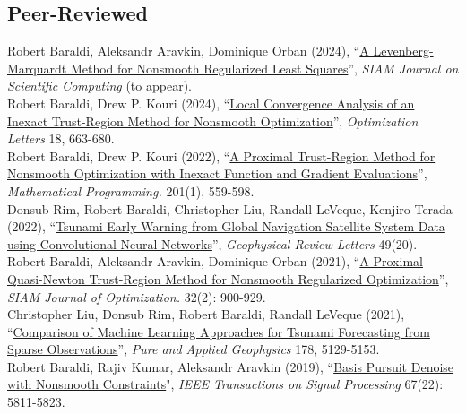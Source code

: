 \documentclass[10pt, a4paper]{article}
\newcommand{\years}[1]{\marginnote{\scriptsize #1}}
\begin{document}
\subsection*{Peer-Reviewed}
\years{2024} Robert Baraldi, Aleksandr Aravkin, Dominique Orban (2024), ``\href{https://arxiv.org/abs/2301.02347}{A Levenberg-Marquardt Method for Nonsmooth Regularized Least Squares}'',  \emph{SIAM Journal on Scientific Computing} (to appear).\\
\years{2024} Robert Baraldi, Drew P. Kouri (2024), ``\href{https://optimization-online.org/2023/11/local-convergence-analysis-of-an-inexact-trust-region-method-for-nonsmooth-optimization/}{Local Convergence Analysis of an Inexact Trust-Region Method for Nonsmooth Optimization}'', \emph{Optimization Letters} 18, 663-680.\\
\years{2022} Robert Baraldi, Drew P. Kouri (2022), ``\href{https://link.springer.com/article/10.1007/s10107-022-01915-3}{A Proximal Trust-Region Method for Nonsmooth Optimization with Inexact Function and Gradient Evaluations}'', \emph{Mathematical Programming.} 201(1), 559-598.\\
\years{2022} Donsub Rim, Robert Baraldi, Christopher Liu, Randall LeVeque, Kenjiro Terada (2022), ``\href{https://agupubs.onlinelibrary.wiley.com/doi/full/10.1029/2022GL099511}{Tsunami Early Warning from Global Navigation Satellite System Data using Convolutional Neural Networks}'', \emph{Geophysical Review Letters} 49(20).\\
\noindent
\years{2021} Robert Baraldi, Aleksandr Aravkin, Dominique Orban (2021), ``\href{https://epubs.siam.org/doi/abs/10.1137/21M1409536}{A Proximal Quasi-Newton Trust-Region Method for Nonsmooth Regularized Optimization}'', \emph{SIAM Journal of Optimization.} 32(2): 900-929.\\
\years{2021} Christopher Liu, Donsub Rim, Robert Baraldi, Randall LeVeque (2021), ``\href{https://link.springer.com/article/10.1007/s00024-021-02841-9}{Comparison of Machine Learning Approaches for Tsunami Forecasting from Sparse Observations}'', \emph{Pure and Applied Geophysics} 178, 5129-5153. \\
\noindent
\years{2019} Robert Baraldi, Rajiv Kumar, Aleksandr Aravkin  (2019), “\href{https://ieeexplore.ieee.org/document/8861392}{Basis Pursuit Denoise with Nonsmooth Constraints}", \emph{IEEE Transactions on Signal Processing} 67(22): 5811-5823.\\
\end{document}
